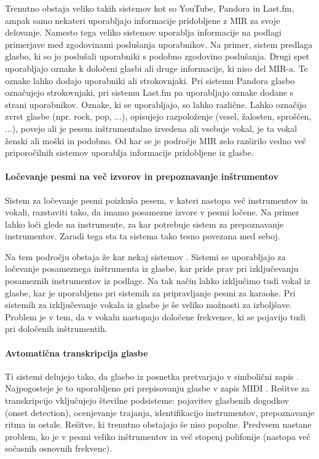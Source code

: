 \documentclass[a4paper, 12pt]{book}
\begin{document}
{Trenutno obstaja veliko takih sistemov kot so YouTube, Pandora in Last.fm, ampak samo nekateri uporabljajo informacije pridobljene z MIR za svoje delovanje. Namesto tega veliko sistemov uporablja informacije na podlagi primerjave med zgodovinami poslušanja uporabnikov. Na primer, sistem predlaga glasbo, ki so jo poslušali uporabniki s podobno zgodovino poslušanja. Drugi spet uporabljajo oznake k določeni glasbi ali druge informacije, ki niso del MIR-a. Te oznake lahko dodajo uporabniki ali strokovnjaki. Pri sistemu Pandora glasbo označujejo strokovnjaki, pri sistemu Last.fm pa uporabljajo oznake dodane s strani uporabnikov. Oznake, ki se uporabljajo, so lahko različne. Lahko označijo zvrst glasbe (npr. rock, pop, ...), opisujejo razpoloženje (vesel, žalosten, sproščen, ...), povejo ali je pesem inštrumentalno izvedena ali vsebuje vokal, je ta vokal ženski ali moški in podobno. Od kar se je področje MIR zelo razširilo vedno več priporočilnih sistemov uporablja informacije pridobljene iz glasbe. 
 
\paragraph{Ločevanje pesmi na več izvorov in prepoznavanje inštrumentov}

Sistem za ločevanje pesmi poizkuša pesem, v kateri nastopa več instrumentov in vokali, razstaviti tako, da imamo posamezne izvore v pesmi ločene. Na primer lahko loči glede na instrumente, za kar potrebuje sistem za prepoznavanje instrumentov. Zaradi tega sta ta sistema tako tesno povezana med seboj. 

Na tem področju obstaja že kar nekaj sistemov \cite{Gillet2008,  Li2007}. Sistemi se uporabljajo za ločevanje posameznega inštrumenta iz glasbe, kar pride prav pri izključevanju posameznih instrumentov iz podlage. Na tak način lahko izključimo tudi vokal iz glasbe, kar je uporabljeno pri sistemih za pripravljanje pesmi za karaoke. Pri sistemih za izključevanje vokala iz glasbe je še veliko možnosti za izboljšave. Problem je v tem, da v vokalu nastopajo določene frekvence, ki se pojavijo tudi pri določenih inštrumentih.  

\paragraph{Avtomatična transkripcija glasbe}

Ti sistemi delujejo tako, da glasbo iz posnetka pretvarjajo v simbolični zapis \cite{Gerhard, Klapuri2006, Klapuri2004}. Najpogosteje je to uporabljeno pri prepisovanju glasbe v zapis MIDI \cite{Smith1983}. Rešitve za transkripcijo vključujejo številne podsisteme: pojavitev glasbenih dogodkov (onset detection), ocenjevanje trajanja, identifikacijo instrumentov, prepoznavanje ritma in ostale. Rešitve, ki trenutno obstajajo še niso popolne. Predvsem nastane problem, ko je v pesmi veliko inštrumentov in več stopenj polifonije (nastopa več sočasnih osnovnih frekvenc). 

}
\end{document}
